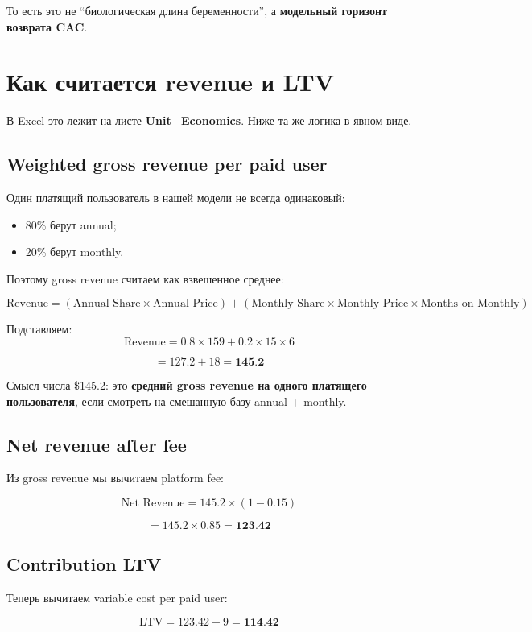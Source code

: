 \documentclass[10pt,a4paper]{article}
\begin{document}
То есть это не ``биологическая длина беременности'', а \textbf{модельный горизонт возврата CAC}.

\section{Как считается revenue и LTV}

В Excel это лежит на листе \textbf{Unit\_Economics}. Ниже та же логика в явном виде.

\subsection{Weighted gross revenue per paid user}

Один платящий пользователь в нашей модели не всегда одинаковый:
\begin{itemize}
    \item 80\% берут annual;
    \item 20\% берут monthly.
\end{itemize}

Поэтому gross revenue считаем как взвешенное среднее:

\[
\text{Revenue} =
(\text{Annual Share} \times \text{Annual Price})
+
(\text{Monthly Share} \times \text{Monthly Price} \times \text{Months on Monthly})
\]

Подставляем:
\[
\text{Revenue} =
0.8 \times 159 + 0.2 \times 15 \times 6
\]

\[
= 127.2 + 18 = \textbf{145.2}
\]

Смысл числа \$145.2:  
это \textbf{средний gross revenue на одного платящего пользователя}, если смотреть на смешанную базу annual + monthly.

\subsection{Net revenue after fee}

Из gross revenue мы вычитаем platform fee:

\[
\text{Net Revenue} = 145.2 \times (1 - 0.15)
\]

\[
= 145.2 \times 0.85 = \textbf{123.42}
\]

\subsection{Contribution LTV}

Теперь вычитаем variable cost per paid user:

\[
\text{LTV} = 123.42 - 9 = \textbf{114.42}
\]
\end{document}
